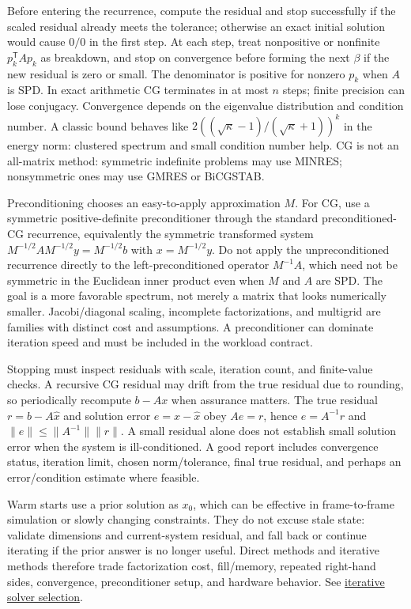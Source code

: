 Before entering the recurrence, compute the residual and stop successfully if the scaled residual already meets the tolerance; otherwise an exact initial solution would cause \(0/0\) in the first step. At each step, treat nonpositive or nonfinite \(p_k^\mathsf TAp_k\) as breakdown, and stop on convergence before forming the next \(\beta\) if the new residual is zero or small. The denominator is positive for nonzero \(p_k\) when \(A\) is SPD. In exact arithmetic CG terminates in at most \(n\) steps; finite precision can lose conjugacy. Convergence depends on the eigenvalue distribution and condition number. A classic bound behaves like \(2((\sqrt\kappa-1)/(\sqrt\kappa+1))^k\) in the energy norm: clustered spectrum and small condition number help. CG is not an all-matrix method: symmetric indefinite problems may use MINRES; nonsymmetric ones may use GMRES or BiCGSTAB.

Preconditioning chooses an easy-to-apply approximation \(M\). For CG, use a symmetric positive-definite preconditioner through the standard preconditioned-CG recurrence, equivalently the symmetric transformed system \(M^{-1/2}AM^{-1/2}y=M^{-1/2}b\) with \(x=M^{-1/2}y\). Do not apply the unpreconditioned recurrence directly to the left-preconditioned operator \(M^{-1}A\), which need not be symmetric in the Euclidean inner product even when \(M\) and \(A\) are SPD. The goal is a more favorable spectrum, not merely a matrix that looks numerically smaller. Jacobi/diagonal scaling, incomplete factorizations, and multigrid are families with distinct cost and assumptions. A preconditioner can dominate iteration speed and must be included in the workload contract.

Stopping must inspect residuals with scale, iteration count, and finite-value checks. A recursive CG residual may drift from the true residual due to rounding, so periodically recompute \(b-Ax\) when assurance matters. The true residual \(r=b-A\hat x\) and solution error \(e=x-\hat x\) obey \(Ae=r\), hence \(e=A^{-1}r\) and \(\|e\|\le\|A^{-1}\|\|r\|\). A small residual alone does not establish small solution error when the system is ill-conditioned. A good report includes convergence status, iteration limit, chosen norm/tolerance, final true residual, and perhaps an error/condition estimate where feasible.

Warm starts use a prior solution as \(x_0\), which can be effective in frame-to-frame simulation or slowly changing constraints. They do not excuse stale state: validate dimensions and current-system residual, and fall back or continue iterating if the prior answer is no longer useful. Direct methods and iterative methods therefore trade factorization cost, fill/memory, repeated right-hand sides, convergence, preconditioner setup, and hardware behavior. See \hyperref[02-foundations-ii-ch038]{iterative solver selection}.

